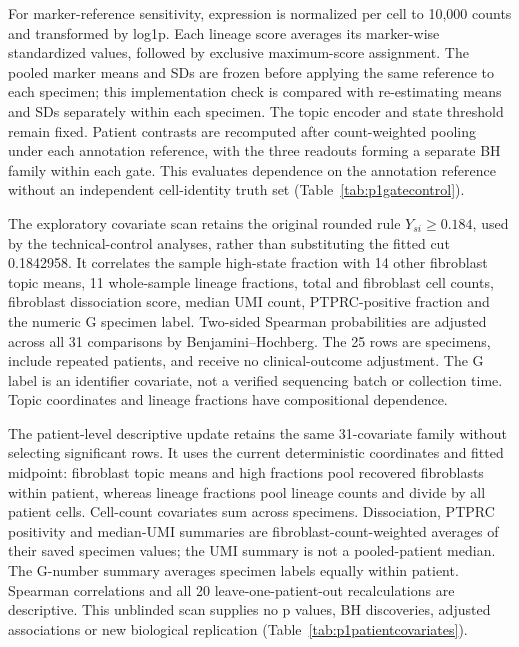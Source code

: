 For marker-reference sensitivity, expression is normalized per cell to 10,000 counts and transformed by log1p. Each lineage score averages its marker-wise standardized values, followed by exclusive maximum-score assignment. The pooled marker means and SDs are frozen before applying the same reference to each specimen; this implementation check is compared with re-estimating means and SDs separately within each specimen. The topic encoder and state threshold remain fixed. Patient contrasts are recomputed after count-weighted pooling under each annotation reference, with the three readouts forming a separate BH family within each gate. This evaluates dependence on the annotation reference without an independent cell-identity truth set (Table~\ref{tab:p1gatecontrol}).

The exploratory covariate scan retains the original rounded rule $Y_{si}\geq0.184$, used by the technical-control analyses, rather than substituting the fitted cut 0.1842958. It correlates the sample high-state fraction with 14 other fibroblast topic means, 11 whole-sample lineage fractions, total and fibroblast cell counts, fibroblast dissociation score, median UMI count, PTPRC-positive fraction and the numeric G specimen label. Two-sided Spearman probabilities are adjusted across all 31 comparisons by Benjamini--Hochberg. The 25 rows are specimens, include repeated patients, and receive no clinical-outcome adjustment. The G label is an identifier covariate, not a verified sequencing batch or collection time. Topic coordinates and lineage fractions have compositional dependence.

The patient-level descriptive update retains the same 31-covariate family without selecting significant rows. It uses the current deterministic coordinates and fitted midpoint: fibroblast topic means and high fractions pool recovered fibroblasts within patient, whereas lineage fractions pool lineage counts and divide by all patient cells. Cell-count covariates sum across specimens. Dissociation, PTPRC positivity and median-UMI summaries are fibroblast-count-weighted averages of their saved specimen values; the UMI summary is not a pooled-patient median. The G-number summary averages specimen labels equally within patient. Spearman correlations and all 20 leave-one-patient-out recalculations are descriptive. This unblinded scan supplies no p values, BH discoveries, adjusted associations or new biological replication (Table~\ref{tab:p1patientcovariates}).

